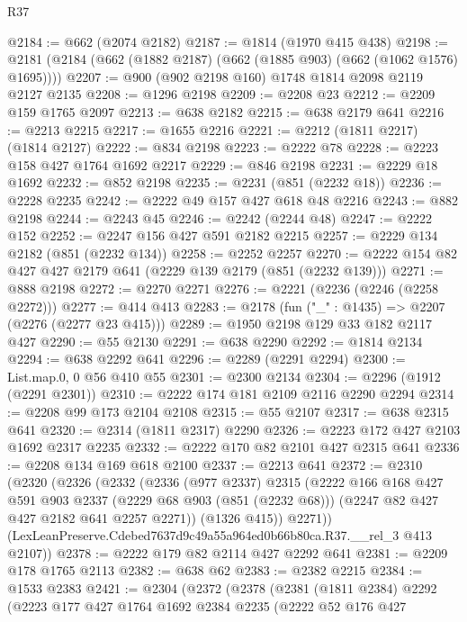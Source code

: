 \begin{lexlean}{R37}
\begin{coremodule}
@2184 := @662 (@2074 @2182)
@2187 := @1814 (@1970 @415 @438)
@2198 := @2181 (@2184 (@662 (@1882 @2187) (@662 (@1885 @903) (@662 (@1062 @1576) @1695))))
@2207 := @900 (@902 @2198 @160) @1748 @1814 @2098 @2119 @2127 @2135
@2208 := @1296 @2198
@2209 := @2208 @23
@2212 := @2209 @159 @1765 @2097
@2213 := @638 @2182
@2215 := @638 @2179 @641
@2216 := @2213 @2215
@2217 := @1655 @2216
@2221 := @2212 (@1811 @2217) (@1814 @2127)
@2222 := @834 @2198
@2223 := @2222 @78
@2228 := @2223 @158 @427 @1764 @1692 @2217
@2229 := @846 @2198
@2231 := @2229 @18 @1692
@2232 := @852 @2198
@2235 := @2231 (@851 (@2232 @18))
@2236 := @2228 @2235
@2242 := @2222 @49 @157 @427 @618 @48 @2216
@2243 := @882 @2198
@2244 := @2243 @45
@2246 := @2242 (@2244 @48)
@2247 := @2222 @152
@2252 := @2247 @156 @427 @591 @2182 @2215
@2257 := @2229 @134 @2182 (@851 (@2232 @134))
@2258 := @2252 @2257
@2270 := @2222 @154 @82 @427 @427 @2179 @641 (@2229 @139 @2179 (@851 (@2232 @139)))
@2271 := @888 @2198
@2272 := @2270 @2271
@2276 := @2221 (@2236 (@2246 (@2258 @2272)))
@2277 := @414 @413
@2283 := @2178 (fun ("_" : @1435) => @2207 (@2276 (@2277 @23 @415)))
@2289 := @1950 @2198 @129 @33 @182 @2117 @427
@2290 := @55 @2130
@2291 := @638 @2290
@2292 := @1814 @2134
@2294 := @638 @2292 @641
@2296 := @2289 (@2291 @2294)
@2300 := List.map.{0, 0} @56 @410 @55
@2301 := @2300 @2134
@2304 := @2296 (@1912 (@2291 @2301))
@2310 := @2222 @174 @181 @2109 @2116 @2290 @2294
@2314 := @2208 @99 @173 @2104 @2108
@2315 := @55 @2107
@2317 := @638 @2315 @641
@2320 := @2314 (@1811 @2317) @2290
@2326 := @2223 @172 @427 @2103 @1692 @2317 @2235
@2332 := @2222 @170 @82 @2101 @427 @2315 @641
@2336 := @2208 @134 @169 @618 @2100
@2337 := @2213 @641
@2372 := @2310
    (@2320
      (@2326
        (@2332
          (@2336
            (@977 @2337)
            @2315
            (@2222
              @166
              @168
              @427
              @591
              @903
              @2337
              (@2229 @68 @903 (@851 (@2232 @68)))
              (@2247 @82 @427 @427 @2182 @641 @2257 @2271))
            (@1326 @415))
          @2271))
      (LexLeanPreserve.Cdebed7637d9c49a55a964ed0b66b80ca.R37.__rel_3 @413 @2107))
@2378 := @2222 @179 @82 @2114 @427 @2292 @641
@2381 := @2209 @178 @1765 @2113
@2382 := @638 @62
@2383 := @2382 @2215
@2384 := @1533 @2383
@2421 := @2304
    (@2372
      (@2378
        (@2381
          (@1811 @2384)
          @2292
          (@2223
            @177
            @427
            @1764
            @1692
            @2384
            @2235
            (@2222
              @52
              @176
              @427

\end{coremodule}
\end{lexlean}
